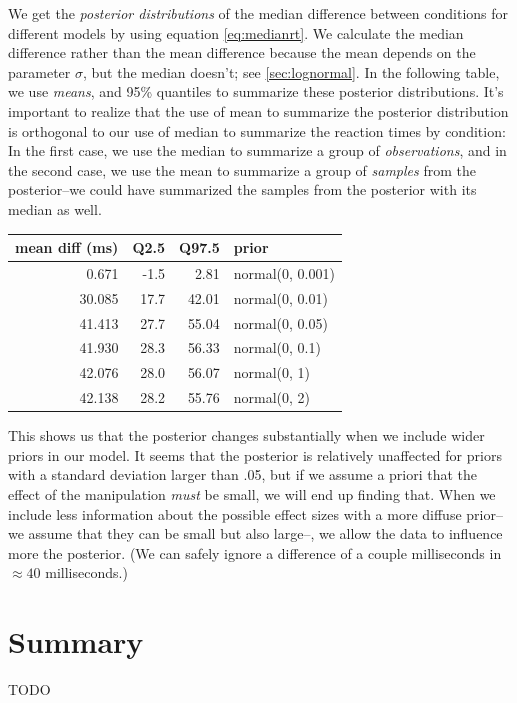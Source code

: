 \documentclass[12pt,]{krantz}
\theoremstyle{definition}
\theoremstyle{definition}
\theoremstyle{definition}
\theoremstyle{remark}
\begin{document}
We get the \emph{posterior distributions} of the median difference between conditions for different models by using equation \eqref{eq:medianrt}. We calculate the median difference rather than the mean difference because the mean depends on the parameter \(\sigma\), but the median doesn't; see \ref{sec:lognormal}. In the following table, we use \emph{means}, and 95\% quantiles to summarize these posterior distributions. It's important to realize that the use of mean to summarize the posterior distribution is orthogonal to our use of median to summarize the reaction times by condition: In the first case, we use the median to summarize a group of \emph{observations}, and in the second case, we use the mean to summarize a group of \emph{samples} from the posterior--we could have summarized the samples from the posterior with its median as well.

\begin{tabular}{r|r|r|l}
\hline
mean diff (ms) & Q2.5 & Q97.5 & prior\\
\hline
0.671 & -1.5 & 2.81 & normal(0, 0.001)\\
\hline
30.085 & 17.7 & 42.01 & normal(0, 0.01)\\
\hline
41.413 & 27.7 & 55.04 & normal(0, 0.05)\\
\hline
41.930 & 28.3 & 56.33 & normal(0, 0.1)\\
\hline
42.076 & 28.0 & 56.07 & normal(0, 1)\\
\hline
42.138 & 28.2 & 55.76 & normal(0, 2)\\
\hline
\end{tabular}

This shows us that the posterior changes substantially when we include wider priors in our model. It seems that the posterior is relatively unaffected for priors with a standard deviation larger than .05, but if we assume a priori that the effect of the manipulation \emph{must} be small, we will end up finding that. When we include less information about the possible effect sizes with a more diffuse prior--we assume that they can be small but also large--, we allow the data to influence more the posterior. (We can safely ignore a difference of a couple milliseconds in \(\approx 40\) milliseconds.)

\hypertarget{summary-2}{%
\section{Summary}\label{summary-2}}

TODO
\end{document}
